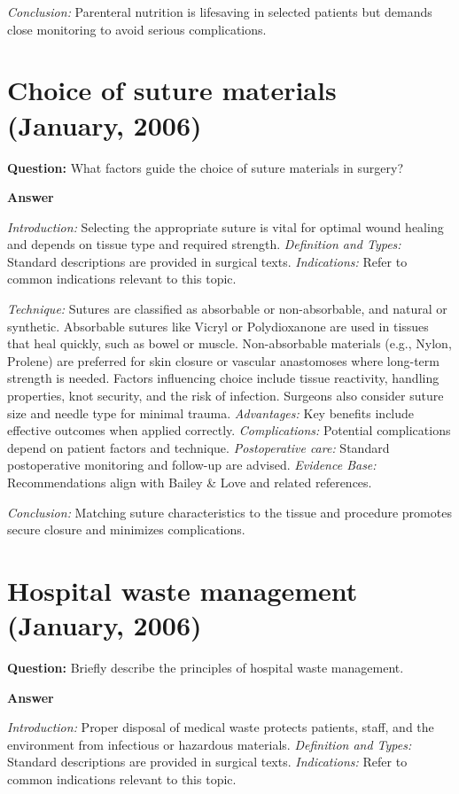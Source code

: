\documentclass{article}
\begin{document}
\emph{Conclusion:} Parenteral nutrition is lifesaving in selected patients but demands close monitoring to avoid serious complications.


\section{Choice of suture materials (January, 2006)}

\textbf{Question:} What factors guide the choice of suture materials in surgery?

\textbf{Answer}

\emph{Introduction:} Selecting the appropriate suture is vital for optimal wound healing and depends on tissue type and required strength.
\emph{Definition and Types:} Standard descriptions are provided in surgical texts.
\emph{Indications:} Refer to common indications relevant to this topic.

\emph{Technique:} Sutures are classified as absorbable or non-absorbable, and natural or synthetic. Absorbable sutures like Vicryl or Polydioxanone are used in tissues that heal quickly, such as bowel or muscle. Non-absorbable materials (e.g., Nylon, Prolene) are preferred for skin closure or vascular anastomoses where long-term strength is needed. Factors influencing choice include tissue reactivity, handling properties, knot security, and the risk of infection. Surgeons also consider suture size and needle type for minimal trauma.
\emph{Advantages:} Key benefits include effective outcomes when applied correctly.
\emph{Complications:} Potential complications depend on patient factors and technique.
\emph{Postoperative care:} Standard postoperative monitoring and follow-up are advised.
\emph{Evidence Base:} Recommendations align with Bailey & Love and related references.

\emph{Conclusion:} Matching suture characteristics to the tissue and procedure promotes secure closure and minimizes complications.


\section{Hospital waste management (January, 2006)}

\textbf{Question:} Briefly describe the principles of hospital waste management.

\textbf{Answer}

\emph{Introduction:} Proper disposal of medical waste protects patients, staff, and the environment from infectious or hazardous materials.
\emph{Definition and Types:} Standard descriptions are provided in surgical texts.
\emph{Indications:} Refer to common indications relevant to this topic.
\end{document}
